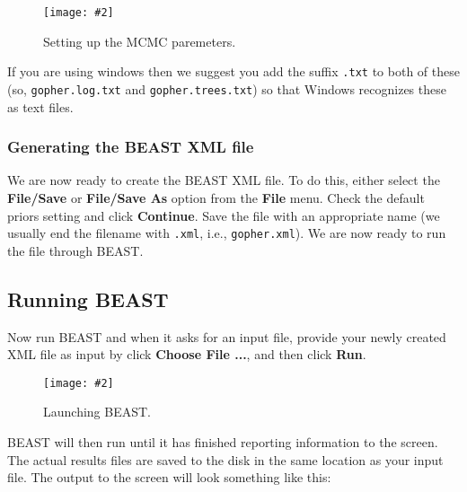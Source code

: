 \documentclass{article}
\newcommand{\includeimage}[2][]{%
\texttt{[image: \#2]}
}
\begin{document}

\begin{figure}
\centering
\includeimage[scale=0.4]{figures/BEAUti_MCMC}

\caption{\label{fig.MCMC} Setting up the MCMC paremeters.}
\end{figure}


If you are using windows then we suggest you add the suffix \texttt{.txt} to both of these (so,
\texttt{gopher.log.txt} and \texttt{gopher.trees.txt}) so that Windows recognizes
these as text files. 

\subsubsection*{Generating the BEAST XML file }

We are now ready to create the BEAST XML file. To do this, either select the {\bf File/Save} or {\bf File/Save As} option from the \textbf{File} menu. Check the default priors setting and click \textbf{Continue}. Save the file with an appropriate name (we usually end the filename with \texttt{.xml}, i.e., \texttt{gopher.xml}). We are now ready to run the file through BEAST. 

\subsection*{Running BEAST }

Now run BEAST and when it asks for an input file, provide your newly
created XML file as input by click \textbf{Choose File ...}, and then click \textbf{Run}. 

\begin{figure}
\centering
\includeimage[scale=0.5]{figures/BEAST}

\caption{\label{fig.BEAST} Launching BEAST.}
\end{figure}


BEAST will then run until it has finished
reporting information to the screen. The actual results files are
saved to the disk in the same location as your input file. The output to the screen will
look something like this: 
\end{document}
